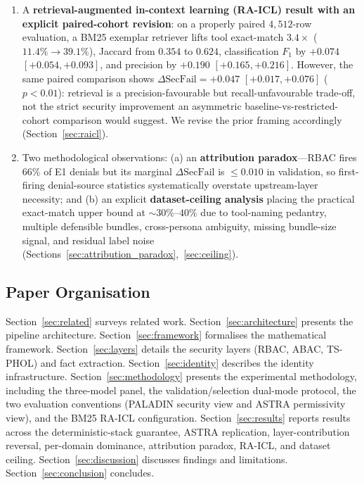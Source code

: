 \documentclass[10pt,a4paper,twocolumn]{article}
\begin{document}
\begin{enumerate}
  \item A \textbf{retrieval-augmented in-context learning (RA-ICL) result with an explicit paired-cohort revision}: on a properly paired $4{,}512$-row evaluation, a BM25 exemplar retriever lifts tool exact-match $3.4\times$ ($11.4\% \to 39.1\%$), Jaccard from $0.354$ to $0.624$, classification $F_1$ by $+0.074$ $[+0.054, +0.093]$, and precision by $+0.190$ $[+0.165, +0.216]$. However, the same paired comparison shows $\Delta\mathrm{SecFail} = +0.047$ $[+0.017, +0.076]$ ($p<0.01$): retrieval is a precision-favourable but recall-unfavourable trade-off, not the strict security improvement an asymmetric baseline-vs-restricted-cohort comparison would suggest. We revise the prior framing accordingly (Section~\ref{sec:raicl}).

  \item Two methodological observations: (a) an \textbf{attribution paradox}---RBAC fires $66\%$ of E1 denials but its marginal $\Delta\mathrm{SecFail}$ is $\leq 0.010$ in validation, so first-firing denial-source statistics systematically overstate upstream-layer necessity; and (b) an explicit \textbf{dataset-ceiling analysis} placing the practical exact-match upper bound at $\sim 30\%$--$40\%$ due to tool-naming pedantry, multiple defensible bundles, cross-persona ambiguity, missing bundle-size signal, and residual label noise (Sections~\ref{sec:attribution_paradox},~\ref{sec:ceiling}).
\end{enumerate}

\subsection{Paper Organisation}
\label{sec:organisation}

Section~\ref{sec:related} surveys related work. Section~\ref{sec:architecture} presents the pipeline architecture. Section~\ref{sec:framework} formalises the mathematical framework. Section~\ref{sec:layers} details the security layers (RBAC, ABAC, TS-PHOL) and fact extraction. Section~\ref{sec:identity} describes the identity infrastructure. Section~\ref{sec:methodology} presents the experimental methodology, including the three-model panel, the validation/selection dual-mode protocol, the two evaluation conventions (PALADIN security view and ASTRA permissivity view), and the BM25 RA-ICL configuration. Section~\ref{sec:results} reports results across the deterministic-stack guarantee, ASTRA replication, layer-contribution reversal, per-domain dominance, attribution paradox, RA-ICL, and dataset ceiling. Section~\ref{sec:discussion} discusses findings and limitations. Section~\ref{sec:conclusion} concludes.
\end{document}

